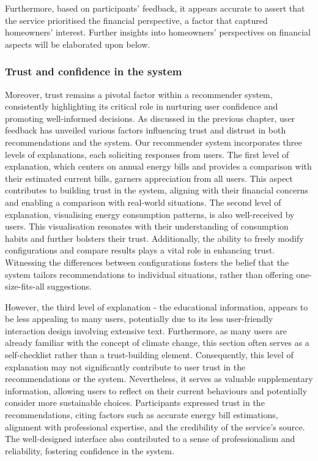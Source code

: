 Furthermore, based on participants' feedback, it appears accurate to assert that the service prioritised the financial perspective, a factor that captured homeowners' interest. 
Further insights into homeowners' perspectives on financial aspects will be elaborated upon below.


\subsubsection*{Trust and confidence in the system}

Moreover, trust remains a pivotal factor within a recommender system, consistently highlighting its critical role in nurturing user confidence and promoting well-informed decisions.
As discussed in the previous chapter, user feedback has unveiled various factors influencing trust and distrust in both recommendations and the system. 
Our recommender system incorporates three levels of explanations, each soliciting responses from users.
The first level of explanation, which centers on annual energy bills and provides a comparison with their estimated current bills, garners appreciation from all users. 
This aspect contributes to building trust in the system, aligning with their financial concerns and enabling a comparison with real-world situations. 
The second level of explanation, visualising energy consumption patterns, is also well-received by users. 
This visualisation resonates with their understanding of consumption habits and further bolsters their trust. 
Additionally, the ability to freely modify configurations and compare results plays a vital role in enhancing trust. 
Witnessing the differences between configurations fosters the belief that the system tailors recommendations to individual situations, rather than offering one-size-fits-all suggestions. 

However, the third level of explanation - the educational information, appears to be less appealing to many users, potentially due to its less user-friendly interaction design involving extensive text. 
Furthermore, as many users are already familiar with the concept of climate change, this section often serves as a self-checklist rather than a trust-building element. 
Consequently, this level of explanation may not significantly contribute to user trust in the recommendations or the system. 
Nevertheless, it serves as valuable supplementary information, allowing users to reflect on their current behaviours and potentially consider more sustainable choices.
Participants expressed trust in the recommendations, citing factors such as accurate energy bill estimations, alignment with professional expertise, and the credibility of the service's source. 
The well-designed interface also contributed to a sense of professionalism and reliability, fostering confidence in the system.


